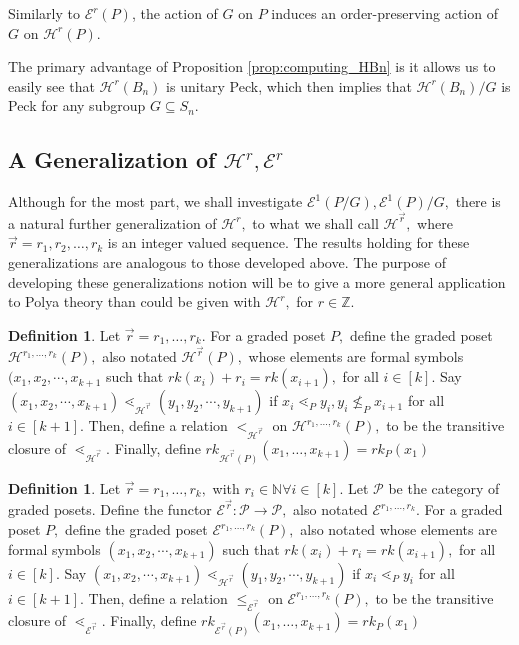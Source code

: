 \documentclass[10 pt]{amsart}
\theoremstyle{plain}
\theoremstyle{definition}
\newtheorem{defn}[thm]{Definition}
\theoremstyle{remark}
\numberwithin{equation}{section}
\newcommand\BN{{\mathbb N}}
\newcommand\BBZ{{\mathbb Z}}
\renewcommand{\vec}[1]{\overrightarrow{#1}}
\begin{document}
Similarly to $\mathcal E^r(P)$, the action of $G$ on $P$ induces an order-preserving action of $G$ on $\mathcal{H}^r(P)$.







The primary advantage of Proposition \ref{prop:computing_HBn} is it allows us to easily see that $\mathcal{H}^r(B_n)$ is unitary Peck, which then implies that $\mathcal{H}^r(B_n)/G$ is Peck for any subgroup $G\subseteq S_n$.




\subsection{A Generalization of $\mathcal H^r,\mathcal E^r$}
Although for the most part, we shall investigate \linebreak
$\mathcal E^1(P/G),\mathcal E^1(P)/G,$ there is a natural further generalization of $\mathcal H^r,$ to what we shall call $\mathcal H^{\vec r},$ where $\vec r = r_1,r_2,\ldots, r_k$ is an integer valued sequence. The results holding for these generalizations are analogous to those developed above. The purpose of developing these generalizations notion will be to give a more general application to Polya theory than could be given with $\mathcal H^r,$ for $r \in \BBZ$.

\begin{defn}
Let $\vec r = r_1,\ldots,r_k.$ For a graded poset $P,$ define the graded poset $\mathcal H^{r_1,\ldots, r_k}(P),$ also notated $\mathcal H^{\vec r}(P),$ whose elements are formal symbols $(x_1, x_2, \cdots, x_{k+1}$ such that $rk(x_i)+r_i = rk(x_{i+1}),$ for all $i \in [k].$ Say $(x_1, x_2, \cdots, x_{k+1})\lessdot_{\mathcal H^{\vec r}} (y_1, y_2, \cdots, y_{k+1})$ if $x_i \lessdot_P y_i,y_{i} \not \leq_P x_{i+1}$ for all $i \in [k+1].$ Then, define a relation $<_{\mathcal H^{\vec r}}$ on $\mathcal H^{r_1,\ldots, r_k}(P),$ to be the transitive closure of $\lessdot_{\mathcal H^{\vec r}}.$ Finally, define $rk_{\mathcal H^{\vec r}(P)}(x_1,\ldots, x_{k+1}) = rk_P(x_1)$
\end{defn}

\begin{defn}
Let $\vec r = r_1,\ldots,r_k,$ with $r_i \in \BN\forall i \in [k].$ Let $\mathcal P$ be the category of graded posets. Define the functor $\mathcal E^{\vec r}:\mathcal P \rightarrow \mathcal P,$ also notated $\mathcal E^{r_1,\ldots, r_k}.$ For a graded poset $P,$ define the graded poset $\mathcal E^{r_1,\ldots, r_k}(P),$ also notated whose elements are formal symbols $(x_1, x_2, \cdots, x_{k+1})$ such that $rk(x_i)+r_i = rk(x_{i+1}),$ for all $i \in [k].$ Say 
$(x_1, x_2, \cdots, x_{k+1})\lessdot_{\mathcal H^{\vec r}} (y_1, y_2, \cdots , y_{k+1})$ if $x_i \lessdot_P y_i$ for all $i \in [k+1]$. Then, define a relation $\leq_{\mathcal E^{\vec r}}$ on $\mathcal E^{r_1,\ldots, r_k}(P),$ to be the transitive closure of $\lessdot_{\mathcal E^{\vec r}}.$ Finally, define $rk_{\mathcal E^{\vec r}(P)}(x_1,\ldots, x_{k+1}) = rk_P(x_1)$
\end{defn}
\end{document}
